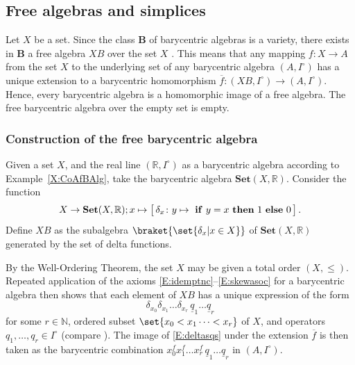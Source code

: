 \documentclass[12pt]{amsart}
\theoremstyle{plain}
\theoremstyle{definition}
\numberwithin{equation}{section}
\begin{document}
\subsection{Free algebras and simplices}\label{SS:barcoord}

Let $X$ be a set. Since the class $\mathbf B$ of barycentric algebras is a variety, there exists in $\mathbf B$ a free algebra $XB$ over the set $X$ \cite[p.308]{PMA}. This means that any mapping $f\colon X\rightarrow A$ from the set $X$ to the underlying set of any barycentric algebra $(A,I^\circ)$ has a unique extension to a barycentric homomorphism $\overline{f}\colon (XB,I^\circ)\rightarrow (A,I^\circ)$. Hence, every barycentric algebra is a homomorphic image of a free algebra. The free barycentric algebra over the empty set is empty.


\subsubsection{Construction of the free barycentric algebra}\label{SSS:FreeBAlg}

Given a set $X$, and the real line $(\mathbb R,I^\circ)$ as a barycentric algebra according to Example~\ref{X:CoAfBAlg}, take the barycentric algebra $\mathbf{Set}(X,\mathbb R)$. Consider the function
\begin{equation}\label{E:delta2xR}
X\to\mathbf{Set}(X,\mathbb R);
x\mapsto
\big[
\,
\delta_x\colon y\mapsto
\mbox{ \textbf{if} } y=x \mbox{ \textbf{then} } 1 \mbox{ \textbf{else} } 0
\,
\big]
\,.
\end{equation}
Define $XB$ as the subalgebra $\braket{\set{\delta_x|x\in X}}$ of $\mathbf{Set}(X,\mathbb R)$ generated by the set of delta functions.


By the Well-Ordering Theorem, the set $X$ may be given a total order $(X,\le)$. Repeated application of the axioms \eqref{E:idemptnc}--\eqref{E:skewasoc} for a barycentric algebra then shows that each element of $XB$ has a unique expression of the form
\begin{equation}\label{E:deltasqs}
\delta_{x_0}\delta_{x_1}\dots\delta_{x_r}\,\underline q_1\dots\underline q_r
\end{equation}
for some $r\in\mathbb N$, ordered subset $\set{x_0<x_1\dots<x_r}$ of $X$, and operators $q_1,\dots, q_r\in I^\circ$ (compare \cite[Lemma~5.8.1]{Modes}). The image of \eqref{E:deltasqs} under the extension $\overline f$ is then taken as the barycentric combination $x_0^fx_1^f\dots x_r^f\,\underline q_1\dots\underline q_r$ in $(A,I^\circ)$.
\end{document}
